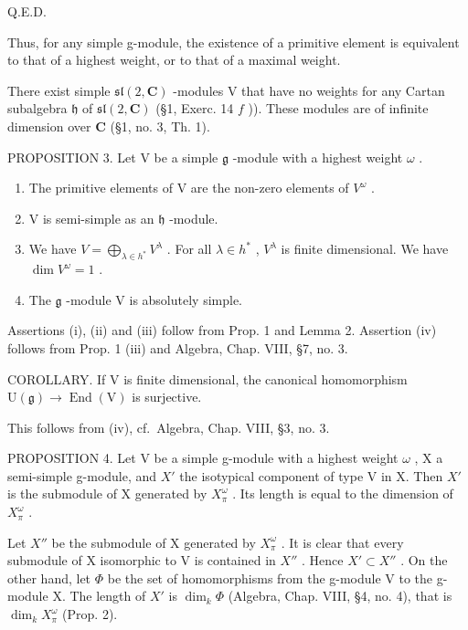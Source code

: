 Q.E.D.

Thus, for any simple g-module, the existence of a primitive element is equivalent to that of a highest weight, or to that of a maximal weight.

There exist simple \(\mathfrak{sl}(2,\mathbf{C})\) -modules V that have no weights for any Cartan subalgebra \(\mathfrak{h}\) of \(\mathfrak{sl}(2,\mathbf{C})\) (§1, Exerc. 14 \(f\) )). These modules are of infinite dimension over \(\mathbf{C}\) (§1, no. 3, Th. 1).

PROPOSITION 3. Let V be a simple \(\mathfrak{g}\) -module with a highest weight \(\omega\) .

\begin{enumerate}
\def\labelenumi{(\roman{enumi})}
\item
  The primitive elements of V are the non-zero elements of \(V^{\omega}\) .
\item
  V is semi-simple as an \(\mathfrak{h}\) -module.
\item
  We have \(V = \bigoplus_{\lambda \in h^{*}} V^{\lambda}\) . For all \(\lambda \in h^{*}\) , \(V^{\lambda}\) is finite dimensional. We have \(\dim V^{\omega} = 1\) .
\item
  The \(\mathfrak{g}\) -module V is absolutely simple.
\end{enumerate}

Assertions (i), (ii) and (iii) follow from Prop. 1 and Lemma 2. Assertion (iv) follows from Prop. 1 (iii) and Algebra, Chap. VIII, §7, no. 3.

COROLLARY. If \(\mathrm{V}\) is finite dimensional, the canonical homomorphism \(\mathrm{U}(\mathfrak{g}) \to \operatorname{End}(\mathrm{V})\) is surjective.

This follows from (iv), cf.~Algebra, Chap. VIII, §3, no. 3.

PROPOSITION 4. Let V be a simple g-module with a highest weight \(\omega\) , X a semi-simple g-module, and \(X'\) the isotypical component of type V in X. Then \(X'\) is the submodule of X generated by \(X_{\pi}^{\omega}\) . Its length is equal to the dimension of \(X_{\pi}^{\omega}\) .

Let \(X''\) be the submodule of X generated by \(X_{\pi}^{\omega}\) . It is clear that every submodule of X isomorphic to V is contained in \(X''\) . Hence \(X' \subset X''\) . On the other hand, let \(\varPhi\) be the set of homomorphisms from the g-module V to the g-module X. The length of \(X'\) is \(\dim_k \varPhi\) (Algebra, Chap. VIII, §4, no. 4), that is \(\dim_k X_{\pi}^{\omega}\) (Prop. 2).

